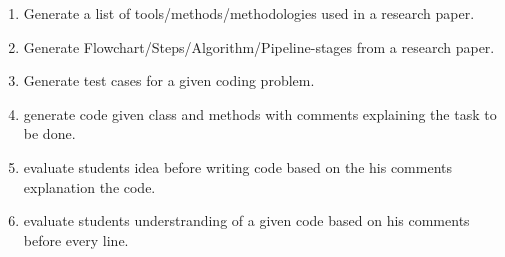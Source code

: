 \begin{enumerate}
        \item Generate a list of tools/methods/methodologies used in a research paper.
        \item Generate Flowchart/Steps/Algorithm/Pipeline-stages from a research paper.
        \item Generate test cases for a given coding problem. \cite{Lee2025}
        \item generate code given class and methods with comments explaining the task to be done.
        \item evaluate students idea before writing code based on the his comments explanation the code.
        \item evaluate students understranding of a given code based on his comments before every line.       
    \end{enumerate}
